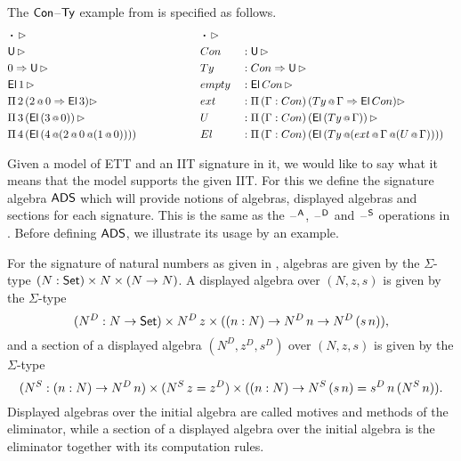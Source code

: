 \documentclass[a4paper,UKenglish,cleveref, autoref]{lipics-v2019}
\begin{document}
\begin{example}
  The $\mathsf{Con}$--$\mathsf{Ty}$ example from  is specified as
  follows.
  \begin{alignat*}{5}
    & \boldsymbol{\cdot} \,\rhd                                                 && \boldsymbol{\cdot} \,\rhd                                                                \\
    & \mathsf{U}\,\rhd                                                                  && Con && : \mathsf{U}\,\rhd                                                                        \\
    & 0\Rightarrow\mathsf{U}\,\rhd                                                              && Ty && : Con\Rightarrow\mathsf{U}\,\rhd                                                                   \\
    & \mathsf{El}\,1\,\rhd                                                              && empty && : \mathsf{El}\,Con\,\rhd                                                                \\
    & \Pi\,2\,(2\mathop{{\scriptstyle @}} 0 \Rightarrow \mathsf{El}\,3)\rhd                                       && ext && : \Pi\,(\Gamma : Con)\,(Ty\mathop{{\scriptstyle @}}\Gamma \Rightarrow \mathsf{El}\,Con)\rhd                         \\
    & \Pi\,3\,(\mathsf{El}\,(3\mathop{{\scriptstyle @}} 0))\,\rhd                                         && U && : \Pi\,(\Gamma:Con)\,(\mathsf{El}\,(Ty\mathop{{\scriptstyle @}}\Gamma))\,\rhd                                 \\
    & \Pi\,4\,(\mathsf{El}\,(4\mathop{{\scriptstyle @}}(2\mathop{{\scriptstyle @}} 0\mathop{{\scriptstyle @}} (1\mathop{{\scriptstyle @}} 0)))) \hspace{4.79em} && El && : \Pi\,(\Gamma : Con)\,(\mathsf{El}\,(Ty\mathop{{\scriptstyle @}}(ext\mathop{{\scriptstyle @}}\Gamma\mathop{{\scriptstyle @}} (U\mathop{{\scriptstyle @}}\Gamma))))
  \end{alignat*}
\end{example}

Given a model of ETT and an IIT signature in it, we would like to say
what it means that the model supports the given IIT. For this we
define the signature algebra $\mathsf{ADS}$ which will provide notions of
algebras, displayed algebras and sections for each signature. This is
the same as the $\mathord{\hspace{1pt}\text{--}\hspace{1pt}}^{\mathsf{A}}$, $\mathord{\hspace{1pt}\text{--}\hspace{1pt}}^{\mathsf{D}}$ and $\mathord{\hspace{1pt}\text{--}\hspace{1pt}}^{\mathsf{S}}$ operations in
\cite{Kaposi:2019:CQI:3302515.3290315}. Before defining $\mathsf{ADS}$, we
illustrate its usage by an example.

\begin{example}
  For the signature of natural numbers as given in
  , algebras are given by the $\Sigma$-type
  $(N:\mathsf{Set})\times N\times(N\rightarrow N)$. A displayed algebra over $(N,z,s)$
  is given by the $\Sigma$-type
  \[
    (N^D:N\rightarrow\mathsf{Set})\times N^D\,z \times((n:N)\rightarrow N^D\,n\rightarrow N^D\,(s\,n)),
  \]
  and a section of a displayed algebra $(N^D,z^D,s^D)$ over $(N,z,s)$
  is given by the $\Sigma$-type
  \[
    (N^S:(n:N)\rightarrow N^D\,n)\times (N^S\,z = z^D) \times((n:N)\rightarrow N^S\,(s\,n) = s^D\,n\,(N^S\,n)).
  \]
  Displayed algebras over the initial algebra are called motives and
  methods of the eliminator, while a section of a displayed algebra
  over the initial algebra is the eliminator together with its
  computation rules.
\end{example}
  
\end{document}
